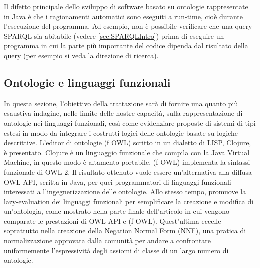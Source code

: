 Il difetto principale dello sviluppo di software basato su ontologie rappresentate in Java è che i ragionamenti automatici sono eseguiti a run-time, cioè durante l'esecuzione del programma. Ad esempio, non è possibile verificare che una query SPARQL sia abitabile (vedere \autoref{sec:SPARQLIntro}) prima di eseguire un programma in cui la parte più importante del codice dipenda dal risultato della query (per esempio si veda la direzione di ricerca).

\subsection{Ontologie e linguaggi funzionali}
In questa sezione, l'obiettivo della trattazione sarà di fornire una quanto più esaustiva indagine, nelle limite delle nostre capacità, sulla rappresentazione di ontologie nei linguaggi funzionali, così come evidenziare proposte di sistemi di tipi estesi in modo da integrare i costrutti logici delle ontologie basate su logiche descrittive.
L'editor di ontologie (f OWL) \cite{fOWL} scritto in un dialetto di LISP, Clojure, è presentato. Clojure è un linguaggio funzionale che compila con la Java Virtual Machine, in questo modo è altamento portabile. (f OWL) implementa la sintassi funzionale di OWL 2. Il risultato ottenuto vuole essere un'alternativa alla diffusa OWL API, scritta in Java, per quei programmatori di linguaggi funzionali interessati a l'ingegnerizzazione delle ontologie. Allo stesso tempo, promuove la lazy-evaluation dei linguaggi funzionali per semplificare la creazione e modifica di un'ontologia, come mostrato nella parte finale dell'articolo in cui vengono comparate le prestazioni di OWL API e (f OWL). Quest'ultima eccelle soprattutto nella creazione della Negation Normal Form (NNF), una pratica di normalizzazione approvata dalla comunità per andare a confrontare uniformemente l'espressività degli assiomi di classe di un largo numero di ontologie.

